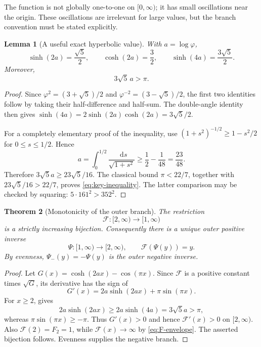 \documentclass[11pt,oneside]{article}
\theoremstyle{plain}
\newtheorem{theorem}{Theorem}[section]
\newtheorem{lemma}[theorem]{Lemma}
\theoremstyle{definition}
\theoremstyle{remark}
\newcommand{\dd}{\mathop{}\!\mathrm{d}}
\newcommand{\Fcal}{\mathcal{F}}
\newcommand{\phig}{\varphi}
\begin{document}
The function is not globally one-to-one on \([0,\infty)\); it has small
oscillations near the origin.  These oscillations are irrelevant for large
values, but the branch convention must be stated explicitly.

\begin{lemma}[A useful exact hyperbolic value]
\label{lem:sinh4a}
With \(a=\log\phig\),
\begin{equation}
 \sinh(2a)=\frac{\sqrt5}{2},\qquad
 \cosh(2a)=\frac32,
 \qquad
 \sinh(4a)=\frac{3\sqrt5}{2}.
 \label{eq:hyperbolic-values}
\end{equation}
Moreover,
\begin{equation}
 3\sqrt5\,a>\pi.
 \label{eq:key-inequality}
\end{equation}
\end{lemma}

\begin{proof}
Since \(\phig^2=(3+\sqrt5)/2\) and
\(\phig^{-2}=(3-\sqrt5)/2\), the first two identities follow by taking their
half-difference and half-sum.  The double-angle identity then gives
\(\sinh(4a)=2\sinh(2a)\cosh(2a)=3\sqrt5/2\).

For a completely elementary proof of the inequality, use
\((1+s^2)^{-1/2}\ge1-s^2/2\) for \(0\le s\le1/2\).  Hence
\[
 a=\int_0^{1/2}\frac{\dd s}{\sqrt{1+s^2}}
 \ge \frac12-\frac1{48}=\frac{23}{48}.
\]
Therefore \(3\sqrt5a\ge23\sqrt5/16\).  The classical bound
\(\pi<22/7\), together with
\(23\sqrt5/16>22/7\), proves \eqref{eq:key-inequality}.  The latter comparison
may be checked by squaring: \(5\cdot161^2>352^2\).
\end{proof}

\begin{theorem}[Monotonicity of the outer branch]
\label{thm:outer-monotone}
The restriction
\begin{equation}
 \Fcal:[2,\infty)\longrightarrow[1,\infty)
 \label{eq:outer-map}
\end{equation}
is a strictly increasing bijection.  Consequently there is a unique outer
positive inverse
\begin{equation}
 \Psi:[1,\infty)\longrightarrow[2,\infty),
 \qquad \Fcal(\Psi(y))=y.
 \label{eq:Psi-definition}
\end{equation}
By evenness, \(\Psi_-(y)=-\Psi(y)\) is the outer negative inverse.
\end{theorem}

\begin{proof}
Let
\(G(x)=\cosh(2ax)-\cos(\pi x)\).  Since \(\Fcal\) is a positive constant
times \(\sqrt{G}\), its derivative has the sign of
\[
 G'(x)=2a\sinh(2ax)+\pi\sin(\pi x).
\]
For \(x\ge2\),  gives
\[
 2a\sinh(2ax)\ge2a\sinh(4a)=3\sqrt5a>\pi,
\]
whereas \(\pi\sin(\pi x)\ge-\pi\).  Thus \(G'(x)>0\) and hence
\(\Fcal'(x)>0\) on \([2,\infty)\).  Also \(\Fcal(2)=F_2=1\), while
\(\Fcal(x)\to\infty\) by \eqref{eq:F-envelope}.  The asserted bijection
follows.  Evenness supplies the negative branch.
\end{proof}
\end{document}
